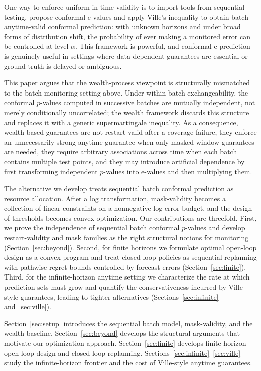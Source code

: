 \documentclass{uai2026} %
\newcommand{\1}{\mathbf{1}}
\begin{document}
One way to enforce uniform-in-time validity is to import tools from sequential testing.
\citet{gauthier2025values} propose conformal e-values and apply Ville's inequality \citep{ville1939etude} to obtain batch anytime-valid conformal prediction: with unknown horizons and under broad forms of distribution shift, the probability of ever making a monitored error can be controlled at level $\alpha$.
This framework is powerful, and conformal e-prediction is genuinely useful in settings where data-dependent guarantees are essential or ground truth is delayed or ambiguous.

This paper argues that the wealth-process viewpoint is structurally mismatched to the batch monitoring setting above.
Under within-batch exchangeability, the conformal $p$-values computed in successive batches are mutually independent, not merely conditionally uncorrelated; the wealth framework discards this structure and replaces it with a generic supermartingale inequality.
As a consequence, wealth-based guarantees are not restart-valid after a coverage failure, they enforce an unnecessarily strong anytime guarantee when only masked window guarantees are needed, they require arbitrary associations across time when each batch contains multiple test points, and they may introduce artificial dependence by first transforming independent $p$-values into e-values and then multiplying them.

The alternative we develop treats sequential batch conformal prediction as resource allocation.
After a log transformation, mask-validity becomes a collection of linear constraints on a nonnegative log-error budget, and the design of thresholds becomes convex optimization.
Our contributions are threefold.
First, we prove the independence of sequential batch conformal $p$-values and develop restart-validity and mask families as the right structural notions for monitoring (Section~\ref{sec:beyond}).
Second, for finite horizons we formulate optimal open-loop design as a convex program and treat closed-loop policies as sequential replanning with pathwise regret bounds controlled by forecast errors (Section~\ref{sec:finite}).
Third, for the infinite-horizon anytime setting we characterize the rate at which prediction sets must grow and quantify the conservativeness incurred by Ville-style guarantees, leading to tighter alternatives (Sections~\ref{sec:infinite} and~\ref{sec:ville}).

Section~\ref{sec:setup} introduces the sequential batch model, mask-validity, and the wealth baseline.
Section~\ref{sec:beyond} develops the structural arguments that motivate our optimization approach.
Section~\ref{sec:finite} develops finite-horizon open-loop design and closed-loop replanning.
Sections~\ref{sec:infinite}--\ref{sec:ville} study the infinite-horizon frontier and the cost of Ville-style anytime guarantees.
\end{document}
